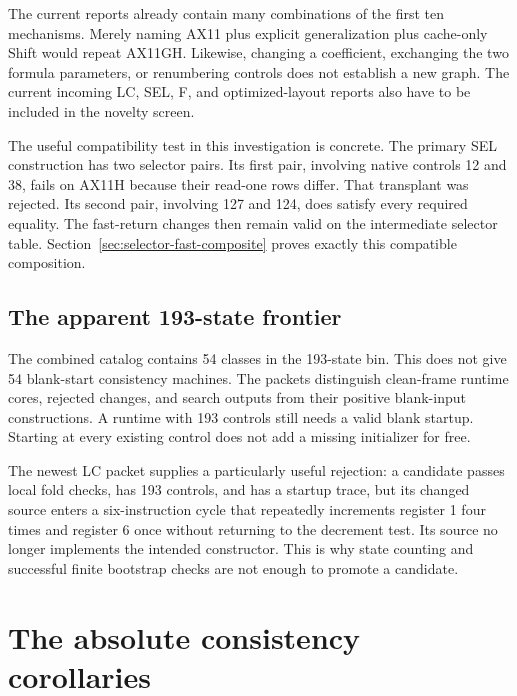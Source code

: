 \documentclass[11pt,letterpaper]{article}
\begin{document}
The current reports already contain many combinations of the first ten
mechanisms. Merely naming AX11 plus explicit generalization plus cache-only
Shift would repeat AX11GH. Likewise, changing a coefficient, exchanging
the two formula parameters, or renumbering controls does not establish a
new graph. The current incoming LC, SEL, F, and optimized-layout reports
also have to be included in the novelty screen.

The useful compatibility test in this investigation is concrete. The
primary SEL construction has two selector pairs. Its first pair, involving
native controls 12 and 38, fails on AX11H because their read-one rows differ.
That transplant was rejected. Its second pair, involving 127 and 124,
does satisfy every required equality. The fast-return changes then remain
valid on the intermediate selector table. Section~\ref{sec:selector-fast-composite}
proves exactly this compatible composition.

\subsection{The apparent 193-state frontier}

The combined catalog contains 54 classes in the 193-state bin. This does
not give 54 blank-start consistency machines. The packets distinguish
clean-frame runtime cores, rejected changes, and search outputs from their
positive blank-input constructions. A runtime with 193 controls still
needs a valid blank startup. Starting at every existing control does not
add a missing initializer for free.

The newest LC packet supplies a particularly useful rejection: a candidate
passes local fold checks, has 193 controls, and has a startup trace, but its
changed source enters a six-instruction cycle that repeatedly increments
register 1 four times and register 6 once without returning to the
decrement test. Its source no longer implements the intended constructor.\cite{lc}
This is why state counting and successful finite bootstrap checks are
not enough to promote a candidate.



\section{The absolute consistency corollaries}\label{sec:calibration}
\end{document}
